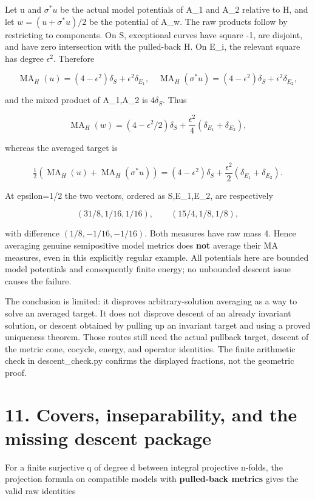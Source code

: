 \documentclass[11pt]{article}
\newcommand{\MA}{\operatorname{MA}}
\begin{document}
Let u and \(\sigma^*u\) be the actual model potentials of A\_1 and A\_2 relative to H, and let \(w=(u+\sigma^*u)/2\) be the potential of A\_w. The raw products follow by restricting to components. On S, exceptional curves have square -1, are disjoint, and have zero intersection with the pulled-back H. On E\_i, the relevant square has degree \(\epsilon^2\). Therefore

\[
\MA_H(u)=(4-\epsilon^2)\delta_S+\epsilon^2\delta_{E_1},
\quad
\MA_H(\sigma^*u)=(4-\epsilon^2)\delta_S+\epsilon^2\delta_{E_2},
\]

and the mixed product of A\_1,A\_2 is \(4\delta_S\). Thus

\[
\MA_H(w)=(4-\epsilon^2/2)\delta_S+
 \frac{\epsilon^2}{4}(\delta_{E_1}+\delta_{E_2}),
\]

whereas the averaged target is

\[
\tfrac12(\MA_H(u)+\MA_H(\sigma^*u))=
(4-\epsilon^2)\delta_S+\frac{\epsilon^2}{2}(\delta_{E_1}+\delta_{E_2}).
\]

At epsilon=1/2 the two vectors, ordered as S,E\_1,E\_2, are respectively

\[
(31/8,1/16,1/16),\qquad (15/4,1/8,1/8),
\]

with difference \((1/8,-1/16,-1/16)\). Both measures have raw mass 4. Hence averaging genuine semipositive model metrics does \textbf{not} average their MA measures, even in this explicitly regular example. All potentials here are bounded model potentials and consequently finite energy; no unbounded descent issue causes the failure.

The conclusion is limited: it disproves arbitrary-solution averaging as a way to solve an averaged target. It does not disprove descent of an already invariant solution, or descent obtained by pulling up an invariant target and using a proved uniqueness theorem. Those routes still need the actual pullback target, descent of the metric cone, cocycle, energy, and operator identities. The finite arithmetic check in descent\_check.py confirms the displayed fractions, not the geometric proof.

\section*{11. Covers, inseparability, and the missing descent package}

For a finite surjective q of degree d between integral projective n-folds, the projection formula on compatible models with \textbf{pulled-back metrics} gives the valid raw identities
\end{document}
